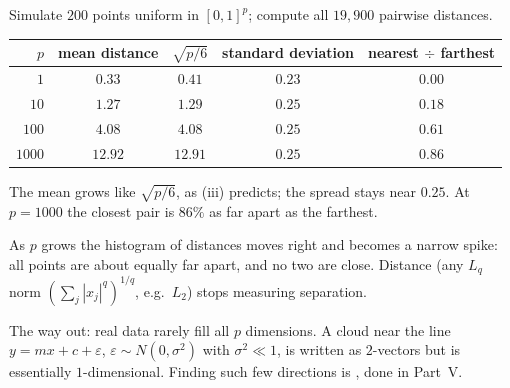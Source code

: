 \begin{example}
Simulate $200$ points uniform in $[0,1]^p$; compute all $19{,}900$ pairwise distances.
\begin{center}
\begin{tabular}{@{}rcccc@{}}
\toprule
$p$ & mean distance & $\sqrt{p/6}$ & standard deviation & nearest $\div$ farthest \\
\midrule
$1$ & $0.33$ & $0.41$ & $0.23$ & $0.00$ \\
$10$ & $1.27$ & $1.29$ & $0.25$ & $0.18$ \\
$100$ & $4.08$ & $4.08$ & $0.25$ & $0.61$ \\
$1000$ & $12.92$ & $12.91$ & $0.25$ & $0.86$ \\
\bottomrule
\end{tabular}
\end{center}
The mean grows like $\sqrt{p/6}$, as (iii) predicts; the spread stays near $0.25$. At $p=1000$ the closest pair is $86\%$ as far apart as the farthest.
\end{example}

As $p$ grows the histogram of distances moves right and becomes a narrow spike: all points are about equally far apart, and no two are close. Distance (any $L_q$ norm $(\sum_j|x_j|^q)^{1/q}$, e.g.\ $L_2$) stops measuring separation.

The way out: real data rarely fill all $p$ dimensions. A cloud near the line $y=mx+c+\varepsilon$, $\varepsilon\sim N(0,\sigma^2)$ with $\sigma^2\ll1$, is written as $2$-vectors but is essentially $1$-dimensional. Finding such few directions is , done in Part~V.

